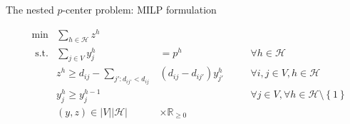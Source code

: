 \documentclass[utf8,aspectratio=169,ngerman,english]{beamer}
\newcommand{\inH}{h \in \mathcal H}
\begin{document}
\begin{frame}{The nested $p$-center problem: MILP formulation}
\begin{minipage}[t]{0.59\linewidth}
\begin{block}
            \vspace{-20pt}
            \begin{subequations}\label{eq:nPCY}
                \begin{alignat}{4}
                     & \min         & \sum_{\inH}z^{h}                                                                          &                               &  &  &                                                             \\
                     & \text{ s.t.} & \sum_{j \in V}y_{j}^h                                                                     & =     p^{h}                   &  &  & \forall \inH                                                \\
                     &              & z^{h} \geq d_{ij} - \sum_{j':d_{ij'} < d_{ij}}                                            & (d_{ij} - d_{ij'})y_{j'}^h \; &  &  & \forall i,j \in V, h \in \mathcal H                         \\
                     &              & y_{j}^h \geq  y_j^{h-1}                                                                   &                               &  &  & \forall j \in V, \forall \inH \setminus \left \{1 \right \} \\
                     &              & (y,z)                                           \in \left|V\right|\left|\mathcal H\right| & \times \mathbb{R}_{\geq 0}    &  &  &
                \end{alignat}
            \end{subequations}
            \vspace{-9pt}
        \end{block}
    \end{minipage}
\end{frame}
\end{document}
